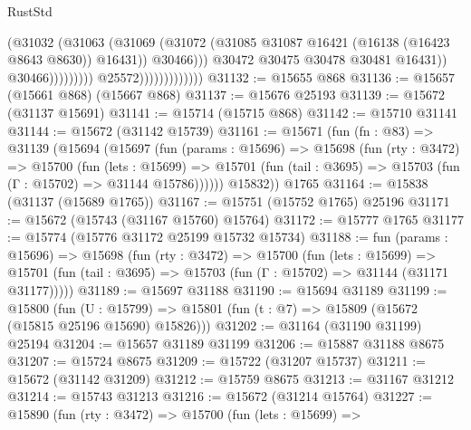 \begin{lexlean}{RustStd}
\begin{coremodule}
                                                    (@31032
                                                      (@31063
                                                        (@31069
                                                          (@31072
                                                            (@31085
                                                              @31087
                                                              @16421
                                                              (@16138 (@16423 @8643 @8630))
                                                              @16431))
                                                          @30466)))
                                                    @30472
                                                    @30475
                                                    @30478
                                                    @30481
                                                    @16431))
                                                @30466)))))))))
                              @25572)))))))))))))
@31132 := @15655 @868
@31136 := @15657 (@15661 @868) (@15667 @868)
@31137 := @15676 @25193
@31139 := @15672 (@31137 @15691)
@31141 := @15714 (@15715 @868)
@31142 := @15710 @31141
@31144 := @15672 (@31142 @15739)
@31161 := @15671
    (fun (fn : @83) =>
    @31139
      (@15694
        (@15697
          (fun (params : @15696) =>
          @15698
            (fun (rty : @3472) =>
            @15700
              (fun (lets : @15699) =>
              @15701 (fun (tail : @3695) => @15703 (fun (Γ : @15702) => @31144 @15786))))))
        @15832))
    @1765
@31164 := @15838 (@31137 (@15689 @1765))
@31167 := @15751 (@15752 @1765) @25196
@31171 := @15672 (@15743 (@31167 @15760) @15764)
@31172 := @15777 @1765
@31177 := @15774 (@15776 @31172 @25199 @15732 @15734)
@31188 := fun (params : @15696) =>
  @15698
    (fun (rty : @3472) =>
    @15700
      (fun (lets : @15699) =>
      @15701 (fun (tail : @3695) => @15703 (fun (Γ : @15702) => @31144 (@31171 @31177)))))
@31189 := @15697 @31188
@31190 := @15694 @31189
@31199 := @15800
    (fun (U : @15799) => @15801 (fun (t : @7) => @15809 (@15672 (@15815 @25196 @15690) @15826)))
@31202 := @31164 (@31190 @31199) @25194
@31204 := @15657 @31189 @31199
@31206 := @15887 @31188 @8675
@31207 := @15724 @8675
@31209 := @15722 (@31207 @15737)
@31211 := @15672 (@31142 @31209)
@31212 := @15759 @8675
@31213 := @31167 @31212
@31214 := @15743 @31213
@31216 := @15672 (@31214 @15764)
@31227 := @15890
    (fun (rty : @3472) =>
    @15700
      (fun (lets : @15699) =>

\end{coremodule}
\end{lexlean}

